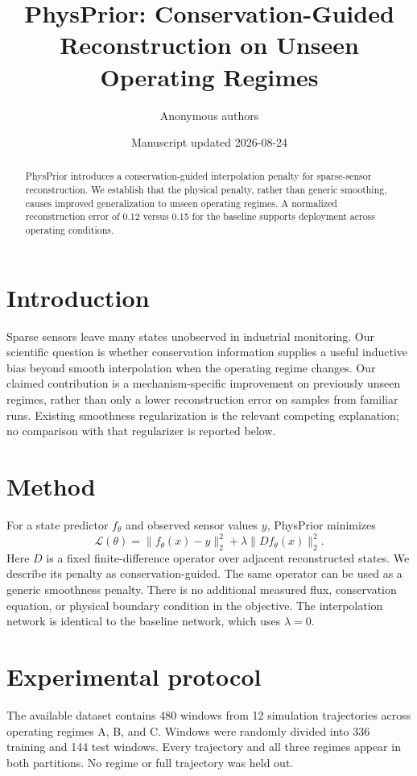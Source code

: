 \documentclass{article}
\title{PhysPrior: Conservation-Guided Reconstruction on Unseen Operating Regimes}
\author{Anonymous authors}
\date{Manuscript updated 2026-08-24}
\begin{document}
\maketitle

\begin{abstract}
PhysPrior introduces a conservation-guided interpolation penalty for sparse-sensor reconstruction. We establish that the physical penalty, rather than generic smoothing, causes improved generalization to unseen operating regimes. A normalized reconstruction error of 0.12 versus 0.15 for the baseline supports deployment across operating conditions.
\end{abstract}

\section{Introduction}
Sparse sensors leave many states unobserved in industrial monitoring. Our scientific question is whether conservation information supplies a useful inductive bias beyond smooth interpolation when the operating regime changes. Our claimed contribution is a mechanism-specific improvement on previously unseen regimes, rather than only a lower reconstruction error on samples from familiar runs. Existing smoothness regularization is the relevant competing explanation; no comparison with that regularizer is reported below.

\section{Method}
For a state predictor $f_\theta$ and observed sensor values $y$, PhysPrior minimizes
\[
\mathcal{L}(\theta) = \|f_\theta(x)-y\|_2^2 + \lambda\|D f_\theta(x)\|_2^2.
\]
Here $D$ is a fixed finite-difference operator over adjacent reconstructed states. We describe its penalty as conservation-guided. The same operator can be used as a generic smoothness penalty. There is no additional measured flux, conservation equation, or physical boundary condition in the objective. The interpolation network is identical to the baseline network, which uses $\lambda=0$.

\section{Experimental protocol}
The available dataset contains 480 windows from 12 simulation trajectories across operating regimes A, B, and C. Windows were randomly divided into 336 training and 144 test windows. Every trajectory and all three regimes appear in both partitions. No regime or full trajectory was held out.
\end{document}

